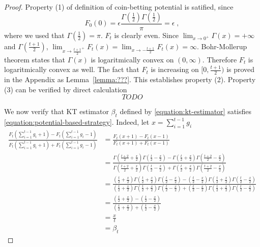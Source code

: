 \begin{proof}
Property (1) of definition of coin-betting potential is satified, since
$$
F_0(0) = \epsilon \frac{\Gamma(\frac{1}{2}) \Gamma(\frac{1}{2})}{\pi} = \epsilon \; ,
$$
where we used that $\Gamma(\frac{1}{2}) = \pi$. $F_t$ is clearly even.
Since $\lim_{x \to 0^+} \Gamma(x) = +\infty$ and $\Gamma(\frac{t+1}{2})$,
$\lim_{x \to \frac{t+1}{2}^+} F_t(x) = \lim_{x \to -\frac{t+1}{2}} F_t(x) = \infty$.
Bohr-Mollerup theorem states that $\Gamma(x)$ is logaritmically convex
on $(0,\infty)$. Therefore $F_t$ is logaritmically convex as well.
The fact that $F_t$ is increasing on $[0,\frac{t+1}{2})$ is proved
in the Appendix as Lemma~\ref{lemma:???}. This establishes property (2).
Property (3) can be verified by direct calculation
$$
TODO
$$

We now verify that KT estimator $\beta_t$ defined by \eqref{equation:kt-estimator}
satisfies \eqref{equation:potential-based-strategy}. Indeed, let $x=\sum_{i=1}^{t-1} g_i$
\begin{align*}
\frac{F_t(\sum_{i=1}^{t-1} g_i + 1) - F_t(\sum_{i=1}^{t-1} g_i - 1)}{F_t(\sum_{i=1}^{t-1} g_i + 1) + F_t(\sum_{i=1}^{t-1} g_i - 1)}
& = \frac{F_t(x + 1) - F_t(x - 1)}{F_t(x + 1) + F_t(x - 1)} \\
& = \frac{\Gamma(\frac{t+2}{2} + \frac{x}{2}) \Gamma(\frac{t}{2} - \frac{x}{2}) - \Gamma(\frac{t}{2} + \frac{x}{2}) \Gamma(\frac{t+2}{2} - \frac{x}{2})}{\Gamma(\frac{t+2}{2} + \frac{x}{2}) \Gamma(\frac{t}{2} - \frac{x}{2}) + \Gamma(\frac{t}{2} + \frac{x}{2}) \Gamma(\frac{t+2}{2} - \frac{x}{2})} \\
& = \frac{(\frac{t}{2} + \frac{x}{2})\Gamma(\frac{t}{2} + \frac{x}{2}) \Gamma(\frac{t}{2} - \frac{x}{2}) - (\frac{t}{2} - \frac{x}{2})\Gamma(\frac{t}{2} + \frac{x}{2}) \Gamma(\frac{t}{2} - \frac{x}{2})}{(\frac{t}{2} + \frac{x}{2})\Gamma(\frac{t}{2} + \frac{x}{2}) \Gamma(\frac{t}{2} - \frac{x}{2}) + (\frac{t}{2} - \frac{x}{2})\Gamma(\frac{t}{2} + \frac{x}{2}) \Gamma(\frac{t}{2} - \frac{x}{2})} \\
& = \frac{(\frac{t}{2} + \frac{x}{2}) - (\frac{t}{2} - \frac{x}{2})}{(\frac{t}{2} + \frac{x}{2}) + (\frac{t}{2} - \frac{x}{2})} \\
& = \frac{x}{t} \\
& = \beta_t
\end{align*}
\end{proof}
